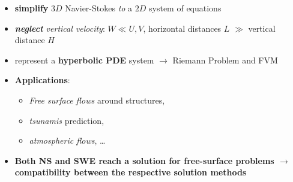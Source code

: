 \begin{frame}
\begin{itemize}
\setlength\itemsep{1.8em}
\item<1-> \textbf{simplify} \textit{$3D$} Navier-Stokes \textit{to} a \textit{$2D$} system of equations
\item<1-> \textit{\textbf{neglect} vertical velocity}:  $ W \ll U,V $, horizontal distances $L$ $\gg$ vertical distance $H$
\item<1-> represent a \textbf{hyperbolic PDE} system $\rightarrow$ Riemann Problem and FVM
\item<1-> \textbf{Applications}: 
\begin{itemize}
\addtolength{\itemindent}{1cm}
\item \textit{Free surface flows} around structures, 
\item \textit{tsunamis} prediction,
\item \textit{atmospheric flows}, \dots
\end{itemize}
\item<2->[]
\begin{tcolorbox}[%
colback=white] 
\textbf{Both NS and SWE reach a solution for free-surface problems $\rightarrow$ compatibility between the respective solution methods}
\end{tcolorbox}
\end{itemize}
\end{frame}
\clearpage


